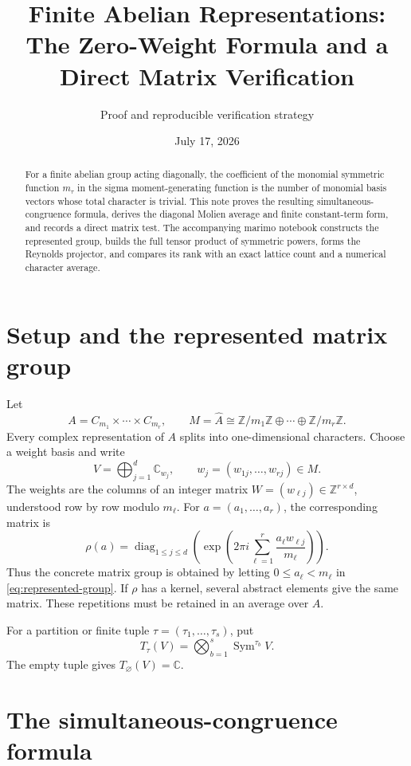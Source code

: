 \documentclass[11pt]{article}
\title{\color{ink}\bfseries Finite Abelian Representations:\\
The Zero-Weight Formula and a Direct Matrix Verification}
\author{Proof and reproducible verification strategy}
\date{July 17, 2026}
\newcommand{\Sym}{\operatorname{Sym}}
\begin{document}
\maketitle
\thispagestyle{titlepage}

\begin{abstract}
For a finite abelian group acting diagonally, the coefficient of the monomial
symmetric function $m_\tau$ in the sigma moment-generating function is the
number of monomial basis vectors whose total character is trivial.  This note
proves the resulting simultaneous-congruence formula, derives the diagonal
Molien average and finite constant-term form, and records a direct matrix test.
The accompanying marimo notebook constructs the represented group, builds the
full tensor product of symmetric powers, forms the Reynolds projector, and
compares its rank with an exact lattice count and a numerical character average.
\end{abstract}

\section{Setup and the represented matrix group}

Let
\[
 A=C_{m_1}\times\cdots\times C_{m_r},\qquad
 M=\widehat A\cong
 \mathbb Z/m_1\mathbb Z\oplus\cdots\oplus\mathbb Z/m_r\mathbb Z.
\]
Every complex representation of $A$ splits into one-dimensional characters.
Choose a weight basis and write
\[
 V=\bigoplus_{j=1}^{d}\mathbb C_{w_j},\qquad
 w_j=(w_{1j},\ldots,w_{rj})\in M.
\]
The weights are the columns of an integer matrix $W=(w_{\ell j})\in
\mathbb Z^{r\times d}$, understood row by row modulo $m_\ell$.  For
$a=(a_1,\ldots,a_r)$, the corresponding matrix is
\begin{equation}\label{eq:represented-group}
 \rho(a)=\operatorname{diag}_{1\le j\le d}
 \left(\exp\left(2\pi i\sum_{\ell=1}^{r}
 \frac{a_\ell w_{\ell j}}{m_\ell}\right)\right).
\end{equation}
Thus the concrete matrix group is obtained by letting
$0\le a_\ell<m_\ell$ in \eqref{eq:represented-group}.  If $\rho$ has a
kernel, several abstract elements give the same matrix.  These repetitions
must be retained in an average over $A$.

For a partition or finite tuple $\tau=(\tau_1,\ldots,\tau_s)$, put
\[
 T_\tau(V)=\bigotimes_{b=1}^{s}\Sym^{\tau_b}V.
\]
The empty tuple gives $T_\varnothing(V)=\mathbb C$.

\section{The simultaneous-congruence formula}
\end{document}
